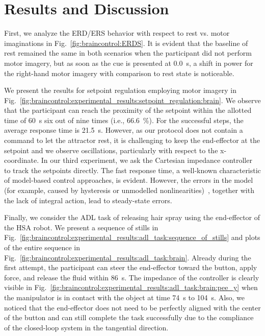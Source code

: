 \section{Results and Discussion}\label{sec:braincontrol:results_and_discussion}

First, we analyze the \gls{ERD}/\gls{ERS} behavior with respect to rest vs. motor imaginations in Fig.~\ref{fig:braincontrol:ERDS}. It is evident that the baseline of rest remained the same in both scenarios when the participant did not perform motor imagery, but as soon as the cue is presented at \SI{0.0}{s}, a shift in power for the right-hand motor imagery with comparison to rest state is noticeable. 

We present the results for setpoint regulation employing motor imagery in Fig.~\ref{fig:braincontrol:experimental_results:setpoint_regulation:brain}. 
We observe that the participant can reach the proximity of the setpoint within the allotted time of \SI{60}{s} six out of nine times (i.e., \SI{66.6}{\percent}).
For the successful steps, the average response time is \SI{21.5}{s}.
However, as our protocol does not contain a command to let the attractor rest, it is challenging to keep the end-effector at the setpoint and we observe oscillations, particularly with respect to the x-coordinate.
In our third experiment, we ask the Cartesian impedance controller to track the setpoints directly.
The fast response time, a well-known characteristic of model-based control approaches, is evident. However, the errors in the model (for example, caused by hysteresis or unmodelled nonlinearities)~\cite{stolzle2023experimental}, together with the lack of integral action, lead to steady-state errors. %

Finally, we consider the \gls{ADL} task of releasing hair spray using the end-effector of the \gls{HSA} robot. We present a sequence of stills in Fig.~\ref{fig:braincontrol:experimental_results:adl_task:sequence_of_stills} and plots of the entire sequence in Fig.~\ref{fig:braincontrol:experimental_results:adl_task:brain}.
Already during the first attempt, the participant can steer the end-effector toward the button, apply force, and release the fluid within \SI{86}{s}.
The impedance of the controller is clearly visible in Fig.~\ref{fig:braincontrol:experimental_results:adl_task:brain:pee_y} when the manipulator is in contact with the object at time \SI{74}{s} to \SI{104}{s}.
Also, we noticed that the end-effector does not need to be perfectly aligned with the center of the button and can still complete the task successfully due to the compliance of the closed-loop system in the tangential direction.

